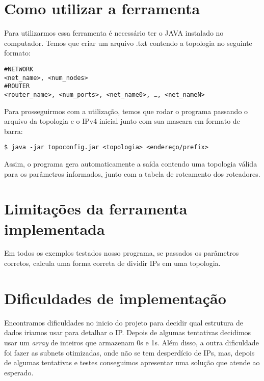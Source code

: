 \documentclass[12pt]{article}
\begin{document}
\section{Como utilizar a ferramenta}

Para utilizarmos essa ferramenta é necessário ter o JAVA instalado no computador. Temos que criar um arquivo .txt contendo a topologia no seguinte formato:
\begin{verbatim}
#NETWORK
<net_name>, <num_nodes>
#ROUTER
<router_name>, <num_ports>, <net_name0>, …, <net_nameN>
\end{verbatim}

Para prosseguirmos com a utilização, temos que rodar o programa passando o arquivo da topologia e o IPv4 inicial junto com sua mascara em formato de barra:
\begin{verbatim}
$ java -jar topoconfig.jar <topologia> <endereço/prefix>
\end{verbatim}

Assim, o programa gera automaticamente a saída contendo uma topologia válida para os parâmetros informados, junto com a tabela de roteamento dos roteadores.

\section{Limitações da ferramenta implementada}
Em todos os exemplos testados nosso programa, se passados os parâmetros corretos, calcula uma forma correta de dividir IPs em uma topologia.

\section{Dificuldades de implementação}
Encontramos dificuldades no inicio do projeto para decidir qual estrutura de dados iriamos usar para detalhar o IP. Depois de algumas tentativas decidimos usar um \textit{array} de inteiros que armazenam 0s e 1s. Além disso, a outra dificuldade foi fazer as subnets otimizadas, onde não se tem desperdício de IPs, mas, depois de algumas tentativas e testes conseguimos apresentar uma solução que atende ao esperado.
\end{document}
